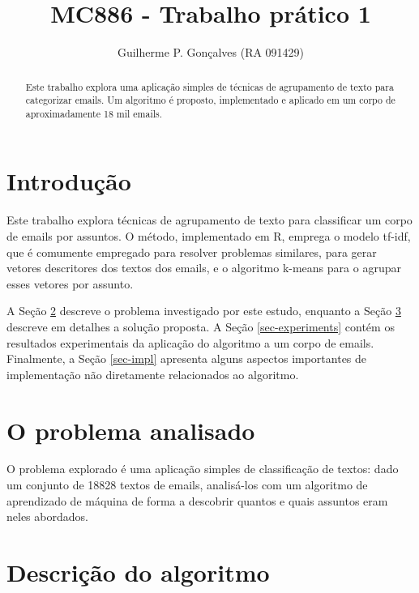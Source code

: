 \documentclass[10pt,twocolumn,letterpaper]{article}
\begin{document}
\title{MC886 - Trabalho prático 1}
\author{Guilherme P. Gonçalves (RA 091429)}

\maketitle
\begin{abstract}
Este trabalho explora uma aplicação simples de técnicas de agrupamento de texto para categorizar emails. Um algoritmo é proposto, implementado e aplicado em um corpo de aproximadamente 18 mil emails.
\end{abstract}

\section{Introdução}

Este trabalho explora técnicas de agrupamento de texto para classificar um corpo de emails por assuntos. O método, implementado em R, emprega o modelo tf-idf, que é comumente empregado para resolver problemas similares\cite{Steinbach00acomparison}, para gerar vetores descritores dos textos dos emails, e o algoritmo k-means para o agrupar esses vetores por assunto.

A Seção \ref{sec-problem} descreve o problema investigado por este estudo, enquanto a Seção \ref{sec-algorithm} descreve em detalhes a solução proposta. A Seção \ref{sec-experiments} contém os resultados experimentais da aplicação do algoritmo a um corpo de emails. Finalmente, a Seção \ref{sec-impl} apresenta alguns aspectos importantes de implementação não diretamente relacionados ao algoritmo.

\section{O problema analisado}
\label{sec-problem}

O problema explorado é uma aplicação simples de classificação de textos: dado um conjunto de 18828 textos de emails, analisá-los com um algoritmo de aprendizado de máquina de forma a descobrir quantos e quais assuntos eram neles abordados.

\section{Descrição do algoritmo}
\label{sec-algorithm}
\end{document}
